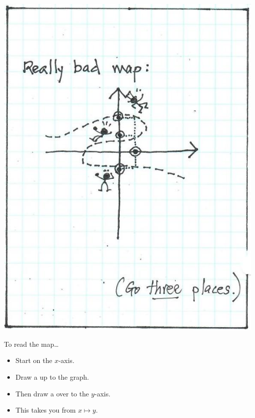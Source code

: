 \begin{tcbraster}[
    raster columns = 3,
    raster equal height,
    colback = white,
    raster equal skip = 0mm,
]
\begin{tcolorbox}[colframe=white]
    \includegraphics[width=\mywidth]{on-maps-12.jpg}
\end{tcolorbox}
\end{tcbraster}

\begin{myConcept}{To read the map\dots}
    \begin{itemize}[nosep]
        \item Start on the $x$-axis.
        \item Draw a   up to the graph.
        \item Then draw a   over to the $y$-axis.
        \item This takes you from $x\mapsto y$.
    \end{itemize}
\end{myConcept}